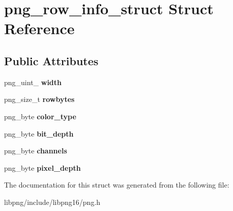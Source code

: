 \hypertarget{structpng__row__info__struct}{\section{png\-\_\-row\-\_\-info\-\_\-struct Struct Reference}
\label{structpng__row__info__struct}
}
\subsection*{Public Attributes}
\begin{DoxyCompactItemize}
\item 
\hypertarget{structpng__row__info__struct_a1ab107da5ffee8100eeaa76cc5ba3e62}{png\-\_\-uint\-\_ {\bfseries width}}\label{structpng__row__info__struct_a1ab107da5ffee8100eeaa76cc5ba3e62}

\item 
\hypertarget{structpng__row__info__struct_a924a208653f2577c05db5e1cf3aa5817}{png\-\_\-size\-\_\-t {\bfseries rowbytes}}\label{structpng__row__info__struct_a924a208653f2577c05db5e1cf3aa5817}

\item 
\hypertarget{structpng__row__info__struct_a646244422549c66e6661cfcdb67c8e28}{png\-\_\-byte {\bfseries color\-\_\-type}}\label{structpng__row__info__struct_a646244422549c66e6661cfcdb67c8e28}

\item 
\hypertarget{structpng__row__info__struct_a6b14d5d0cc32f151c28c568cf1c1f82d}{png\-\_\-byte {\bfseries bit\-\_\-depth}}\label{structpng__row__info__struct_a6b14d5d0cc32f151c28c568cf1c1f82d}

\item 
\hypertarget{structpng__row__info__struct_a7cefee70361a3789a862001aefcd872f}{png\-\_\-byte {\bfseries channels}}\label{structpng__row__info__struct_a7cefee70361a3789a862001aefcd872f}

\item 
\hypertarget{structpng__row__info__struct_a70b84917ef9eabc9b7d29ec96fd01153}{png\-\_\-byte {\bfseries pixel\-\_\-depth}}\label{structpng__row__info__struct_a70b84917ef9eabc9b7d29ec96fd01153}

\end{DoxyCompactItemize}


The documentation for this struct was generated from the following file\-:\begin{DoxyCompactItemize}
\item 
libpng/include/libpng16/png.\-h\end{DoxyCompactItemize}
